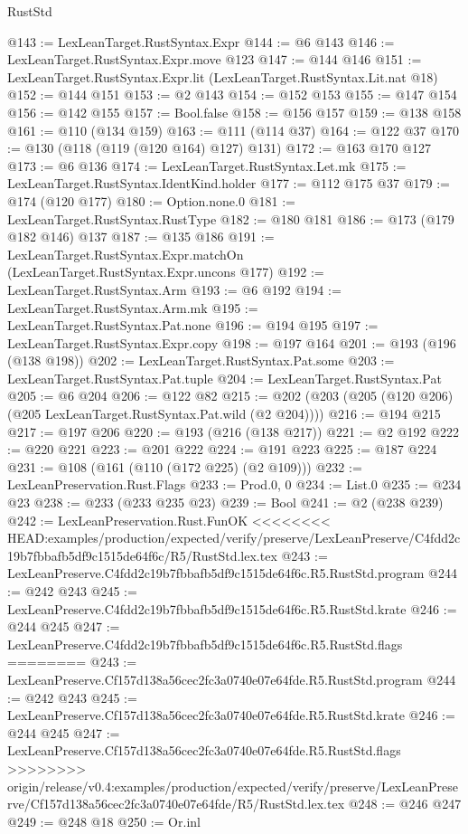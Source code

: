 \begin{lexlean}{RustStd}
\begin{coremodule}
{\begin{coremodule}
{{{{{{@143 := LexLeanTarget.RustSyntax.Expr
@144 := @6 @143
@146 := LexLeanTarget.RustSyntax.Expr.move @123
@147 := @144 @146
@151 := LexLeanTarget.RustSyntax.Expr.lit (LexLeanTarget.RustSyntax.Lit.nat @18)
@152 := @144 @151
@153 := @2 @143
@154 := @152 @153
@155 := @147 @154
@156 := @142 @155
@157 := Bool.false
@158 := @156 @157
@159 := @138 @158
@161 := @110 (@134 @159)
@163 := @111 (@114 @37)
@164 := @122 @37
@170 := @130 (@118 (@119 (@120 @164) @127) @131)
@172 := @163 @170 @127
@173 := @6 @136
@174 := LexLeanTarget.RustSyntax.Let.mk
@175 := LexLeanTarget.RustSyntax.IdentKind.holder
@177 := @112 @175 @37
@179 := @174 (@120 @177)
@180 := Option.none.{0}
@181 := LexLeanTarget.RustSyntax.RustType
@182 := @180 @181
@186 := @173 (@179 @182 @146) @137
@187 := @135 @186
@191 := LexLeanTarget.RustSyntax.Expr.matchOn (LexLeanTarget.RustSyntax.Expr.uncons @177)
@192 := LexLeanTarget.RustSyntax.Arm
@193 := @6 @192
@194 := LexLeanTarget.RustSyntax.Arm.mk
@195 := LexLeanTarget.RustSyntax.Pat.none
@196 := @194 @195
@197 := LexLeanTarget.RustSyntax.Expr.copy
@198 := @197 @164
@201 := @193 (@196 (@138 @198))
@202 := LexLeanTarget.RustSyntax.Pat.some
@203 := LexLeanTarget.RustSyntax.Pat.tuple
@204 := LexLeanTarget.RustSyntax.Pat
@205 := @6 @204
@206 := @122 @82
@215 := @202 (@203 (@205 (@120 @206) (@205 LexLeanTarget.RustSyntax.Pat.wild (@2 @204))))
@216 := @194 @215
@217 := @197 @206
@220 := @193 (@216 (@138 @217))
@221 := @2 @192
@222 := @220 @221
@223 := @201 @222
@224 := @191 @223
@225 := @187 @224
@231 := @108 (@161 (@110 (@172 @225) (@2 @109)))
@232 := LexLeanPreservation.Rust.Flags
@233 := Prod.{0, 0}
@234 := List.{0}
@235 := @234 @23
@238 := @233 (@233 @235 @23)
@239 := Bool
@241 := @2 (@238 @239)
@242 := LexLeanPreservation.Rust.FunOK
<<<<<<<< HEAD:examples/production/expected/verify/preserve/LexLeanPreserve/C4fdd2c19b7fbbafb5df9c1515de64f6c/R5/RustStd.lex.tex
@243 := LexLeanPreserve.C4fdd2c19b7fbbafb5df9c1515de64f6c.R5.RustStd.program
@244 := @242 @243
@245 := LexLeanPreserve.C4fdd2c19b7fbbafb5df9c1515de64f6c.R5.RustStd.krate
@246 := @244 @245
@247 := LexLeanPreserve.C4fdd2c19b7fbbafb5df9c1515de64f6c.R5.RustStd.flags
========
@243 := LexLeanPreserve.Cf157d138a56cec2fc3a0740e07e64fde.R5.RustStd.program
@244 := @242 @243
@245 := LexLeanPreserve.Cf157d138a56cec2fc3a0740e07e64fde.R5.RustStd.krate
@246 := @244 @245
@247 := LexLeanPreserve.Cf157d138a56cec2fc3a0740e07e64fde.R5.RustStd.flags
>>>>>>>> origin/release/v0.4:examples/production/expected/verify/preserve/LexLeanPreserve/Cf157d138a56cec2fc3a0740e07e64fde/R5/RustStd.lex.tex
@248 := @246 @247
@249 := @248 @18
@250 := Or.inl
}}}}}}
\end{coremodule}}
\end{coremodule}
\end{lexlean}

